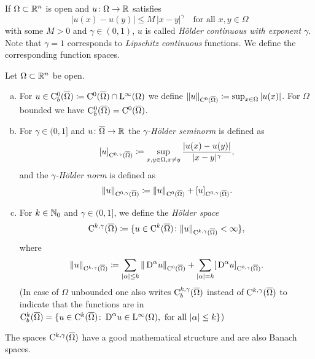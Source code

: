 If $\Omega \subset \mathbb{R}^n$ is open and $u \colon \Omega \to \mathbb{R}$ satisfies
\begin{equation}
  \label{eq:hoelderCond}
  |u(x) - u(y)| \leq M\, |x - y|^\gamma \quad\text{for all } x, y \in \Omega
\end{equation}
with some $M > 0$ and $\gamma \in (0,1)$, $u$ is called \emph{Hölder continuous with exponent $\gamma$}.
Note that $\gamma = 1$ corresponds to \emph{Lipschitz continuous} functions.
We define the corresponding function spaces.

\begin{defn}
  Let $\Omega \subset \mathbb{R}^n$ be open.
  \begin{enumerate}[a)]
    \item For $u \in \mathrm{C}_b^0(\overline\Omega) \coloneqq \mathrm{C}^0(\overline\Omega) \cap \mathrm{L}^\infty(\Omega)$ we define $\|u\|_{\mathrm{C}^0(\overline\Omega)} \coloneqq \sup_{x \in \Omega} |u(x)|$.
      For $\Omega$ bounded we have $\mathrm{C}_b^0(\overline\Omega) = \mathrm{C}^0(\overline\Omega)$.

    \item For $\gamma \in (0,1]$ and $u \colon \overline\Omega \to \mathbb{R}$ the \emph{$\gamma$-Hölder seminorm} is defined as
    $$
    [u]_{\mathrm{C}^{0,\gamma}(\overline\Omega)} \coloneqq \sup_{x,y \in \Omega, x \neq y} \frac{|u(x)  - u(y)|}{|x - y|^\gamma},
    $$
    and the \emph{$\gamma$-Hölder norm} is defined as 
    $$
    \|u\|_{\mathrm{C}^{0,\gamma}(\overline\Omega)} \coloneqq \| u\|_{\mathrm{C}^0(\overline\Omega)} + [u]_{\mathrm{C}^{0,\gamma}(\overline\Omega)}.
    $$

    \item For $k \in \mathbb{N}_0$ and $\gamma \in (0,1]$, we define the \emph{Hölder space}
      $$
      \mathrm{C}^{k,\gamma}(\overline\Omega) \coloneqq \{ u \in \mathrm{C}^k(\overline\Omega) \colon \|u\|_{\mathrm{C}^{k,\gamma}(\overline\Omega)} < \infty \},
      $$
      where
      $$
      \| u\|_{\mathrm{C}^{k,\gamma}(\overline\Omega)} \coloneqq \sum_{|\alpha| \leq k} \|\,{\operatorname{D}}^\alpha u\|_{\mathrm{C}^0(\overline\Omega)} + \sum_{|\alpha| = k} [\,{\operatorname{D}}^\alpha u]_{\mathrm{C}^{0,\gamma}(\overline\Omega)}.
      $$
      (In case of $\Omega$ unbounded one also writes $\mathrm{C}_b^{k,\gamma}(\overline\Omega)$ instead of $\mathrm{C}^{k,\gamma}(\overline\Omega)$ to indicate that the functions are in $\mathrm{C}_b^k(\overline\Omega) = \{ u \in \mathrm{C}^k(\overline\Omega) \colon \,{\operatorname{D}}^\alpha u \in \mathrm{L}^\infty(\Omega), \text{ for all } |\alpha| \leq k \}$)
  \end{enumerate}
\end{defn}

The spaces $\mathrm{C}^{k,\gamma}(\overline\Omega)$ have a good mathematical structure and are also Banach spaces.

